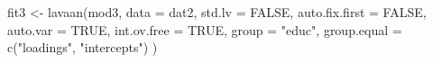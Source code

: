 \begin{Schunk}
\begin{Sinput}
 fit3 <- lavaan(mod3,
                data = dat2,
                std.lv = FALSE,
                auto.fix.first = FALSE,
                auto.var = TRUE,
                int.ov.free = TRUE,
                group = "educ",
                group.equal = c("loadings", "intercepts")
                )
\end{Sinput}
\end{Schunk}
